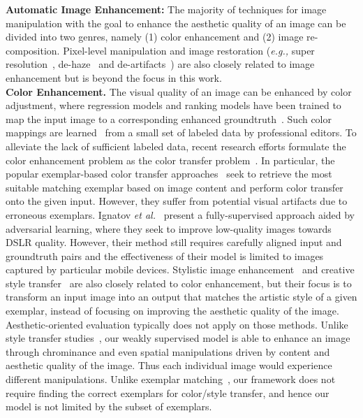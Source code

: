 \documentclass[sigconf]{acmart}
\newcommand{\etal}{\textit{et al.}}
\begin{document}
\noindent\textbf{Automatic Image Enhancement:}
The majority of techniques for image manipulation with the goal to enhance the aesthetic quality of an image can be divided into two genres, namely (1) color enhancement and (2) image re-composition. Pixel-level manipulation and image restoration (\textit{e.g.,} super resolution~\cite{dong2016image}, de-haze~\cite{he2011single} and de-artifacts~\cite{wang2016d3}) are also closely related to image enhancement but is beyond the focus in this work.
\\
\noindent\textbf{Color Enhancement.}
The visual quality of an image can be enhanced by color adjustment, where regression models and ranking models have been trained to map the input image to a corresponding enhanced groundtruth~\cite{faridul2014survey}. Such color mappings are learned~\cite{yan2014learning} from a small set of labeled data by professional editors. To alleviate the lack of sufficient labeled data, recent research efforts formulate the color enhancement problem as the color transfer problem~\cite{hwang2014color,reinhard2001color}. In particular, the popular exemplar-based color transfer approaches~\cite{lee2016automatic,sun2016photo} seek to retrieve the most suitable matching exemplar based on image content and perform color transfer onto the given input. However, they suffer from potential visual artifacts due to erroneous exemplars. 
Ignatov \etal~\cite{ignatov2017dslr} present a fully-supervised approach aided by adversarial learning, where they seek to improve low-quality images towards DSLR quality. However, their method still requires carefully aligned input and groundtruth pairs and the effectiveness of their model is limited to images captured by particular mobile devices.  
Stylistic image enhancement~\cite{yan2016automatic} and creative style transfer~\cite{gupta2017characterizing,huang2017arbitrary,johnson2016perceptual,ulyanov2016instance} are also closely related to color enhancement, but their focus is to transform an input image into an output that matches the artistic style of a given exemplar, instead of focusing on improving the aesthetic quality of the image. 
Aesthetic-oriented evaluation typically does not apply on those methods. 
Unlike style transfer studies~\cite{yan2016automatic,gupta2017characterizing}, our weakly supervised model is able to enhance an image through chrominance and even spatial manipulations driven by content and aesthetic quality of the image. Thus each individual image would experience different manipulations. Unlike exemplar matching~\cite{lee2016automatic,sun2016photo}, our framework does not require finding the correct exemplars for color/style transfer, and hence our model is not limited by the subset of exemplars.
\end{document}
